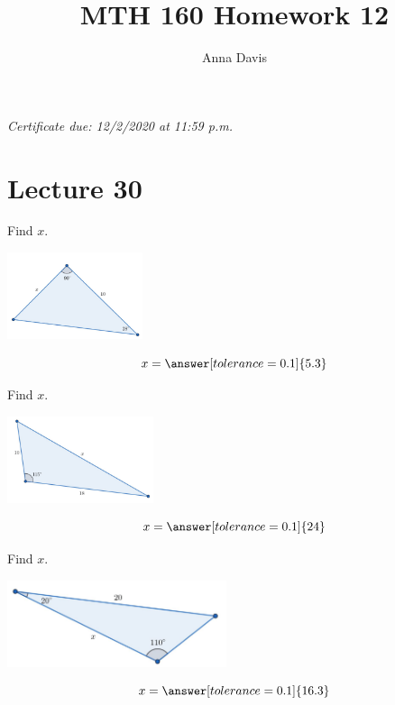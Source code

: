 \documentclass{ximera}
\author{Anna Davis} \title{MTH 160 Homework 12}
\begin{document}
\begin{abstract}

\end{abstract}
\maketitle
 \textit{Certificate due: 12/2/2020 at 11:59 p.m.}
  \section{Lecture 30}
  \begin{problem}\label{prob:160hom12prob1}
  Find $x$.
\begin{image}
   
\includegraphics[height=1in]{160H12pic1.jpg}~
 
\end{image}
$$x=\answer[tolerance=0.1]{5.3}$$
\end{problem}

\begin{problem}\label{prob:160hom12prob2}
Find $x$.
\begin{image}
   
\includegraphics[height=1in]{160H12pic3.jpg}~
 
\end{image}
$$x=\answer[tolerance=0.1]{24}$$
\end{problem}

\begin{problem}\label{prob:160hom12prob3}
Find $x$.
\begin{image}
   
\includegraphics[height=1in]{160H12pic2.jpg}~
 
\end{image}
$$x=\answer[tolerance=0.1]{16.3}$$
\end{problem}
\end{document}
